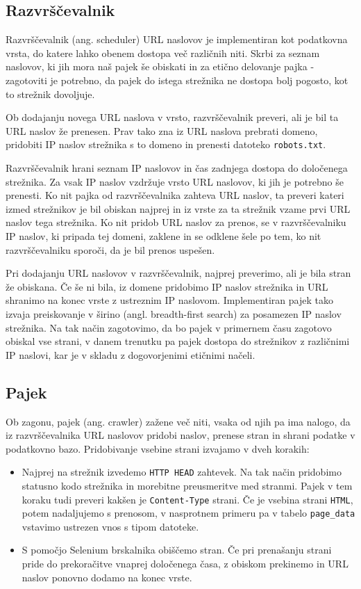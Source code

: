 \documentclass[conference]{IEEEtran}
\begin{document}
	\subsection{Razvrščevalnik}

	Razvrščevalnik (ang. scheduler) URL naslovov je implementiran kot podatkovna vrsta, do katere lahko obenem dostopa več različnih niti. Skrbi za seznam naslovov, ki jih mora naš pajek še obiskati in za etično delovanje pajka - zagotoviti je potrebno, da pajek do istega strežnika ne dostopa bolj pogosto, kot to strežnik dovoljuje.
	
	Ob dodajanju novega URL naslova v vrsto, razvrščevalnik preveri, ali je bil ta URL naslov že prenesen. Prav tako zna iz URL naslova prebrati domeno, pridobiti IP naslov strežnika s to domeno in prenesti datoteko \texttt{robots.txt}.
	
	Razvrščevalnik hrani seznam IP naslovov in čas zadnjega dostopa do določenega strežnika. Za vsak IP naslov vzdržuje vrsto URL naslovov, ki jih je potrebno še prenesti. Ko nit pajka od razvrščevalnika zahteva URL naslov, ta preveri kateri izmed strežnikov je bil obiskan najprej in iz vrste za ta strežnik vzame prvi URL naslov tega strežnika. Ko nit pridob URL naslov za prenos, se v razvrščevalniku IP naslov, ki pripada tej domeni, zaklene in se odklene šele po tem, ko nit razvrščevalniku sporoči, da je bil prenos uspešen.
	
	Pri dodajanju URL naslovov v razvrščevalnik, najprej preverimo, ali je bila stran že obiskana. Če še ni bila, iz domene pridobimo IP naslov strežnika in URL shranimo na konec vrste z ustreznim IP naslovom. Implementiran pajek tako izvaja preiskovanje v širino (angl. breadth-first search) za posamezen IP naslov strežnika. Na tak način zagotovimo, da bo pajek v primernem času zagotovo obiskal vse strani, v danem trenutku pa pajek dostopa do strežnikov z različnimi IP naslovi, kar je v skladu z dogovorjenimi etičnimi načeli.
	
	\subsection{Pajek}
	
	Ob zagonu, pajek (ang. crawler) zažene več niti, vsaka od njih pa ima nalogo, da iz razvrščevalnika URL naslovov pridobi naslov, prenese stran in shrani podatke v podatkovno bazo. Pridobivanje vsebine strani izvajamo v dveh korakih:
	
	\begin{itemize}
		\item Najprej na strežnik izvedemo \texttt{HTTP HEAD} zahtevek. Na tak način pridobimo statusno kodo strežnika in morebitne preusmeritve med stranmi. Pajek v tem koraku tudi preveri kakšen je \texttt{Content-Type} strani. Če je vsebina strani \texttt{HTML}, potem nadaljujemo s prenosom, v nasprotnem primeru pa v tabelo \texttt{page\_data} vstavimo ustrezen vnos s tipom datoteke.
		\item S pomočjo Selenium brskalnika obiščemo stran. Če pri prenašanju strani pride do prekoračitve vnaprej določenega časa, z obiskom prekinemo in URL naslov ponovno dodamo na konec vrste.
	\end{itemize}
\end{document}
